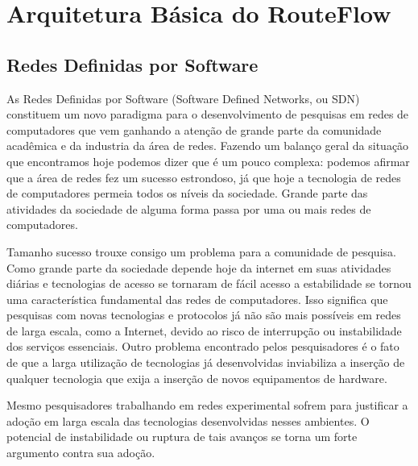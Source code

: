 \chapter{Arquitetura Básica do RouteFlow}

\section{Redes Definidas por Software} As Redes Definidas
por Software (Software Defined Networks, ou SDN) constituem
um novo paradigma para o desenvolvimento de pesquisas em
redes de computadores que vem ganhando a atenção de grande
parte da comunidade acadêmica e da industria da área de
redes. Fazendo um balanço geral da situação que encontramos
hoje podemos dizer que é um pouco complexa: podemos afirmar
que a área de redes fez um sucesso estrondoso, já que hoje a
tecnologia de redes de computadores permeia todos os níveis
da sociedade. Grande parte das atividades da sociedade de
alguma forma passa por uma ou mais redes de computadores.

Tamanho sucesso trouxe consigo um problema para a comunidade
de pesquisa. Como grande parte da sociedade depende hoje da
internet em suas atividades diárias e tecnologias de acesso
se tornaram de fácil acesso a estabilidade se tornou uma
característica fundamental das redes de computadores. Isso
significa que pesquisas com novas tecnologias e protocolos
já não são mais possíveis em redes de larga escala, como a
Internet, devido ao risco de interrupção ou instabilidade
dos serviços essenciais. Outro problema encontrado pelos
pesquisadores é o fato de que a larga utilização de
tecnologias já desenvolvidas inviabiliza a inserção de
qualquer tecnologia que exija a inserção de novos
equipamentos de hardware.

Mesmo pesquisadores trabalhando em redes experimental sofrem
para justificar a adoção em larga escala das tecnologias
desenvolvidas nesses ambientes. O potencial de instabilidade
ou ruptura de tais avanços se torna um forte argumento
contra sua adoção.


